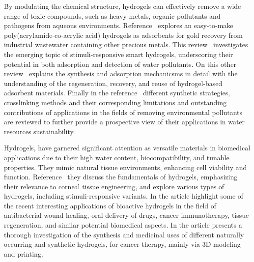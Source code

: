 By modulating the chemical structure, hydrogels can effectively remove a wide range of toxic compounds, such as heavy metals, organic pollutants and pathogens from aqueous environments.
Reference~\citep{cinfrigniniGoldRushDesigning2024} explores an easy-to-make poly(acrylamide-co-acrylic acid) hydrogels as adsorbents for gold recovery from industrial wastewater containing other precious metals.
This review~\citep{randoFunctionalBioBasedPolymeric2024} investigates the emerging topic of stimuli-responsive smart hydrogels, underscoring their potential in both adsorption and detection of water pollutants.
On this other review~\citep{darbanHydrogelBasedAdsorbentMaterial2022a} explains the synthesis and adsorption mechanicsms in detail with the understanding of the regeneration, recovery, and reuse of hydrogel-based adsorbent materials.
Finally in the reference~\citep{songSynthesisHydrogelsTheir2022} different synthetic strategies, crosslinking methods and their corresponding limitations and outstanding contributions of applications in the fields of removing environmental pollutants are reviewed to further provide a prospective view of their applications in water resources sustainability.

Hydrogels, have garnered significant attention as versatile materials in biomedical applications due to their high water content, biocompatibility, and tunable properties. 
They mimic natural tissue environments, enhancing cell viability and function.
Reference~\citep{wuAdvancementsHydrogelsCorneal2024} they discuss the fundamentals of hydrogels, emphasizing their relevance to corneal tissue engineering, and explore various types of hydrogels, including stimuli-responsive variants.
In the article\citep{kaurHydrogelsPotentialBiomaterial2024} highlight some of the recent interesting applications of bioactive hydrogels in the field of antibacterial wound healing, oral delivery of drugs, cancer immunotherapy, tissue regeneration, and similar potential biomedical aspects.
In the article\citep{thummaIntroductionClassificationApplications2025} presents a thorough investigation of the synthesis and medicinal uses of different naturally occurring and synthetic hydrogels, for cancer therapy, mainly via 3D modeling and printing.

